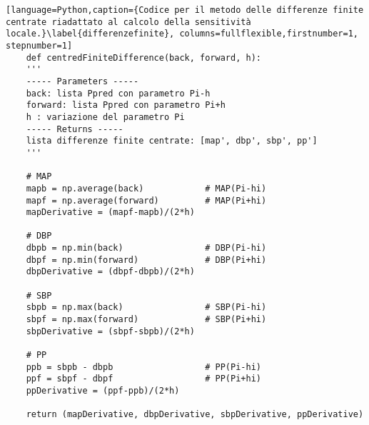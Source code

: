 \begin{lstlisting}[language=Python,caption={Codice per il metodo delle differenze finite centrate riadattato al calcolo della sensitività locale.}\label{differenzefinite}, columns=fullflexible,firstnumber=1, stepnumber=1]
    def centredFiniteDifference(back, forward, h):
    '''
    ----- Parameters -----
    back: lista Ppred con parametro Pi-h
    forward: lista Ppred con parametro Pi+h
    h : variazione del parametro Pi
    ----- Returns -----
    lista differenze finite centrate: [map', dbp', sbp', pp']        
    '''
    
    # MAP
    mapb = np.average(back)            # MAP(Pi-hi)
    mapf = np.average(forward)         # MAP(Pi+hi)
    mapDerivative = (mapf-mapb)/(2*h)
    
    # DBP
    dbpb = np.min(back)                # DBP(Pi-hi)
    dbpf = np.min(forward)             # DBP(Pi+hi)
    dbpDerivative = (dbpf-dbpb)/(2*h)
    
    # SBP
    sbpb = np.max(back)                # SBP(Pi-hi)
    sbpf = np.max(forward)             # SBP(Pi+hi)
    sbpDerivative = (sbpf-sbpb)/(2*h)
    
    # PP
    ppb = sbpb - dbpb                  # PP(Pi-hi)
    ppf = sbpf - dbpf                  # PP(Pi+hi)
    ppDerivative = (ppf-ppb)/(2*h)
    
    return (mapDerivative, dbpDerivative, sbpDerivative, ppDerivative)
\end{lstlisting}